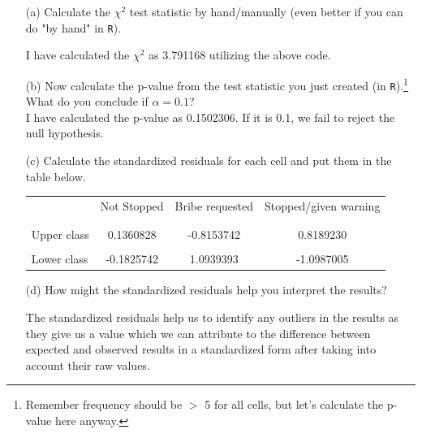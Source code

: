 \documentclass[12pt,letterpaper]{article}
\begin{document}
\begin{enumerate}
	
	\item [(a)]
	Calculate the $\chi^2$ test statistic by hand/manually (even better if you can do "by hand" in \texttt{R}).\\
	\vspace{1cm}
	  
	I have calculated the  $\chi^2$ as 3.791168 utilizing the above code.
	
	\item [(b)]
	Now calculate the p-value from the test statistic you just created (in \texttt{R}).\footnote{Remember frequency should be $>$ 5 for all cells, but let's calculate the p-value here anyway.}  What do you conclude if $\alpha = 0.1$?\\
	
	  

I have calculated the p-value as 0.1502306. If it is 0.1, we fail to reject the null hypothesis.
	
	\item [(c)] Calculate the standardized residuals for each cell and put them in the table below.
	\vspace{1cm}
	

	\begin{table}[h]
		\centering
		\begin{tabular}{l | c c c }
			& Not Stopped & Bribe requested & Stopped/given warning \\
			\\[-1.8ex] 
			\hline \\[-1.8ex]
			Upper class  & 0.1360828 &  -0.8153742 & 0.8189230  \\
			\\
			Lower class & -0.1825742  & 1.0939393   & -1.0987005  \\
			
		\end{tabular}
	\end{table}

	  
	
	
	\item [(d)] How might the standardized residuals help you interpret the results?  
	
	The standardized residuals help us to identify any outliers in the results as they give us a value which we can attribute to the difference between expected and observed results in a standardized form after taking into account their raw values.
	
\end{enumerate}
\newpage
\end{document}
